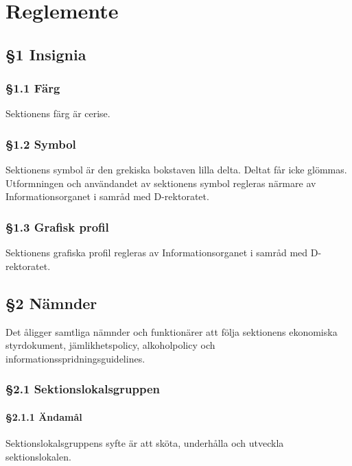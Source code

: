 
\section{Reglemente}

\subsection{§1 Insignia}

\subsubsection{§1.1 Färg}

Sektionens färg är cerise.

\subsubsection{§1.2 Symbol}

Sektionens symbol är den grekiska bokstaven lilla delta. Deltat får icke glömmas. Utformningen och användandet av sektionens symbol regleras närmare av Informationsorganet i samråd med D-rektoratet.

\subsubsection{§1.3 Grafisk profil}

Sektionens grafiska profil regleras av Informationsorganet i samråd med D-rektoratet.

\subsection{§2 Nämnder}

Det åligger samtliga nämnder och funktionärer att följa sektionens ekonomiska styrdokument, jämlikhetspolicy, alkoholpolicy och informationsspridningsguidelines.

\subsubsection{§2.1 Sektionslokalsgruppen}

\paragraph{§2.1.1 Ändamål}

Sektionslokalsgruppens syfte är att sköta, underhålla och utveckla sektionslokalen.

